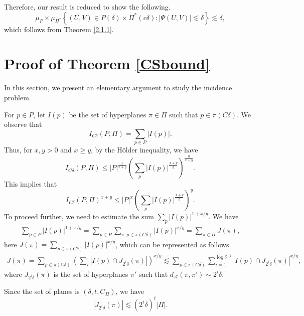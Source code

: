 \documentclass[11pt]{article}
\newcommand{\1}{\mathbf{1}}
\begin{document}
Therefore, our result is reduced to show the following.
\[\mu_P\times \mu_{\Pi^*}\left\lbrace (U, V)\in P(\delta)\times \Pi^*(c\delta)\colon |\Psi(U, V)|\lesssim \delta \right\rbrace\lesssim \delta,\]
which follows from Theorem \ref{2.1.1}.


\section{Proof of Theorem \ref{CSbound}}
In this section, we present an elementary argument to study the incidence problem.

For $p\in P$, let $I(p)$ be the set of hyperplanes $\pi\in \Pi$ such that $p\in \pi(C\delta)$. We observe that
\[I_{C\delta}(P, \Pi)=\sum_{p\in P}|I(p)|.\]
Thus, for $x, y > 0$ and $x\ge y$, by the H\"{o}lder inequality, we have
\[I_{C\delta}(P, \Pi)\le |P|^{\frac{x}{x+y}}\left(\sum_{p}|I(p)|^{\frac{x+y}{y}}\right)^{\frac{y}{x+y}}.\]
This implies that
\[I_{C\delta}(P, \Pi)^{x+y}\le |P|^{x}\left(\sum_{p}|I(p)|^{\frac{x+y}{y}}\right)^{y}.\]
To proceed further, we need to estimate the sum $\sum_{p}|I(p)|^{1+x/y}$.
We have
\begin{align*}
    \sum_{p\in P}|I(p)|^{1+x/y}=\sum_{p\in P}\sum_{\pi\colon p\in \pi(C\delta)}|I(p)|^{x/y}=\sum_{\pi\in \Pi}J(\pi),
\end{align*}
here $J(\pi)=\sum_{p\in \pi(C\delta)}|I(p)|^{x/y}$, which can be represented as follows
\begin{align*}
    J(\pi)=\sum_{p\in \pi(C\delta)}\left(\sum_{i}|I(p)\cap J_{2^i\delta}(\pi)
    |\right)^{x/y} \lesssim \sum_{p\in \pi(C\delta)} \sum_{i=1}^{\log \delta^{-1}}|I(p)\cap J_{2^i\delta}(\pi)|^{x/y},
\end{align*}
where $J_{2^i\delta}(\pi)$ is the set of hyperplanes $\pi'$ such that $d_{\mathcal{A}}(\pi, \pi')\sim 2^i\delta$.

Since the set of planes is $(\delta, t, C_\Pi)$, we have
\[|J_{2^i\delta}(\pi)| \lesssim (2^i \delta)^t|\Pi|.\]
\end{document}
